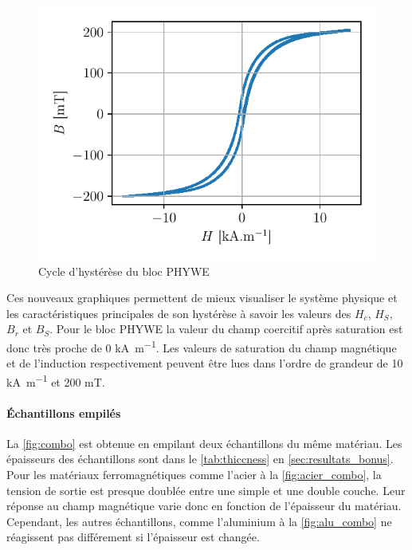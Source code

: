 \begin{minipage}{\linewidth}
    \begin{figure}
        \includegraphics[width=\linewidth]{figures/G1-phywe-avec-bloc_chang.pdf}
        \caption{Cycle d'hystérèse du bloc PHYWE}
        \label{fig:calibr_phywe}
    \end{figure}

    Ces nouveaux graphiques permettent de mieux visualiser le système physique et les caractéristiques principales de son hystérèse à savoir les valeurs des \(H_c\), \(H_S\), \(B_r\) et \(B_S\). Pour le bloc PHYWE la valeur du champ coercitif après saturation est donc très proche de 0 \si{\kilo\ampere\per\meter}. Les valeurs de saturation  du champ magnétique et de l'induction respectivement peuvent être lues dans l'ordre de grandeur de 10 \si{\kilo\ampere\per\meter} et 200 \si{\milli\tesla}.

    \paragraph{Échantillons empilés}
    La \autoref{fig:combo} est obtenue en empilant deux échantillons du même matériau. Les épaisseurs des échantillons sont dans le \autoref{tab:thiccness} en \autoref{sec:resultats_bonus}. Pour les matériaux ferromagnétiques comme l'acier à la \autoref{fig:acier_combo}, la tension de sortie est presque doublée entre une simple et une double couche. Leur réponse au champ magnétique varie donc en fonction de l'épaisseur du matériau. Cependant, les autres échantillons, comme l'aluminium à la \autoref{fig:alu_combo} ne réagissent pas différement si l'épaisseur est changée.
\end{minipage}


